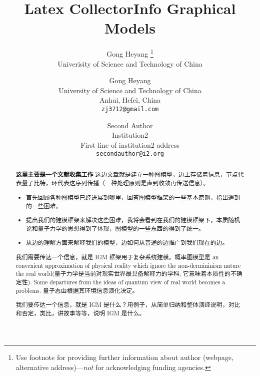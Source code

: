 \documentclass{article}
\title{{Latex Collector}}
\author{
   Gong Heyang \thanks{Use footnote for providing further
    information about author (webpage, alternative
    address)---\emph{not} for acknowledging funding agencies.} \\
    Univerisity of Science and Technology of China \\
}
\theoremstyle{definition}
\theoremstyle{remark}
\theoremstyle{definition}
\begin{document}
\begin{CJK*}{UTF8}{gbsn}

\title{Info Graphical Models}

\author{Gong Heyang\\
University of Science and Technology of China\\
Anhui, Hefei, China\\
{\tt\small zj3712@gmail.com}
\and
Second Author\\
Institution2\\
First line of institution2 address\\
{\tt\small secondauthor@i2.org}
}

\maketitle

\begin{abstract}
    \textbf{这里主要是一个文献收集工作} 这边文章就是建立一种图模型，边上存储着信息，节点代表量子比特，环代表这序列传播（一种处理原则是直到收敛再传送信息）。 
    \begin{itemize}
        \item 首先回顾各种图模型已经进展到哪里，回答图模型框架的一些基本原则，指出遇到的一些困难。 
        \item 提出我们的建模框架来解决这些困难，我将会看到在我们的建模框架下，本质随机论和量子力学的思想得到了体现，图模型的一些东西的得到了统一。
        \item 从边的理解方面来解释我们的模型，边如何从普通的边推广到我们现在的边。
    \end{itemize}
    
    我们需要传达一个信息，就是 IGM 框架用于复杂系统建模。概率图模型是 an convenient approximation of physical reality which ignore the non-dermininism nature the real world(量子力学是当前对现实世界最具备解释力的学科, 它意味着本质性的不确定性). Some departures from the ideas of quantum view of real world becomes a problems. 量子态由根据其环境信息演化决定。
    
    我们要传达一个信息，就是 IGM 是什么？用例子，从简单归纳和整体演绎说明，对比和否定，类比，讲故事等等，说明 IGM 是什么。
    

\end{abstract}
\end{CJK*}
\end{document}
